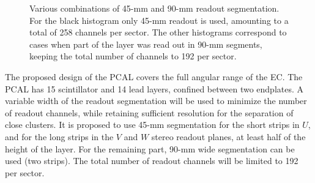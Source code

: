 \begin{figure}[ht]
\vspace{9.3cm}
\caption{\small{Various combinations of 45-mm and 90-mm readout 
segmentation.  For the black histogram only 45-mm readout is used, amounting
to a total of 258 channels per sector.  The other histograms correspond to 
cases when part of the layer was read out in 90-mm segments, keeping the 
total number of channels to 192 per sector.}}  
\label{fig:vwidteff} 
\end{figure}

The proposed design of the PCAL covers the full angular range of the EC. 
The PCAL has 15 scintillator and 14 lead layers, confined between two 
endplates.  A variable width of the readout segmentation will be used to
minimize the number of readout channels, while retaining sufficient
resolution for the separation of close clusters. It is proposed to
use 45-mm segmentation for the short strips in $U$, and for the long
strips in the $V$ and $W$ stereo readout planes, at least half of the 
height of the layer.  For the remaining part, 90-mm wide segmentation can 
be used (two strips).  The total number of readout channels will be limited 
to 192 per sector. 
